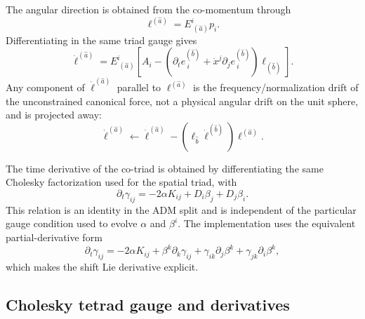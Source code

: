 \documentclass[11pt]{article}
\begin{document}
The angular direction is obtained from the co-momentum through
\begin{equation}
  \ell^{(\hat a)} = E^i_{\ (\hat a)}p_i .
\end{equation}
Differentiating in the same triad gauge gives
\begin{equation}
  \dot\ell^{(\hat a)}
  =E^i_{\ (\hat a)}
  \left[
    A_i
    -\left(\partial_t e^{(\hat b)}_{\ i}
    +\dot x^j\partial_j e^{(\hat b)}_{\ i}\right)\ell_{(\hat b)}
  \right].
  \label{eq:admdotell}
\end{equation}
Any component of \(\dot\ell^{(\hat a)}\) parallel to
\(\ell^{(\hat a)}\) is the frequency/normalization drift of the unconstrained
canonical force, not a physical angular drift on the unit sphere, and is
projected away:
\begin{equation}
  \dot\ell^{(\hat a)}
  \leftarrow
  \dot\ell^{(\hat a)}
  -(\ell_{\hat b}\dot\ell^{(\hat b)})\ell^{(\hat a)} .
  \label{eq:ell_projection}
\end{equation}

The time derivative of the co-triad is obtained by differentiating the same
Cholesky factorization used for the spatial triad, with
\begin{equation}
  \partial_t\gamma_{ij}
  =-2\alpha K_{ij}+D_i\beta_j+D_j\beta_i .
  \label{eq:adm_gdot}
\end{equation}
This relation is an identity in the ADM split and is independent of the
particular gauge condition used to evolve \(\alpha\) and \(\beta^i\).
The implementation uses the equivalent partial-derivative form
\begin{equation}
  \partial_t\gamma_{ij}
  =
  -2\alpha K_{ij}
  +\beta^k\partial_k\gamma_{ij}
  +\gamma_{ik}\partial_j\beta^k
  +\gamma_{jk}\partial_i\beta^k ,
  \label{eq:adm_gdot_partial}
\end{equation}
which makes the shift Lie derivative explicit.

\subsection{Cholesky tetrad gauge and derivatives}
\end{document}

